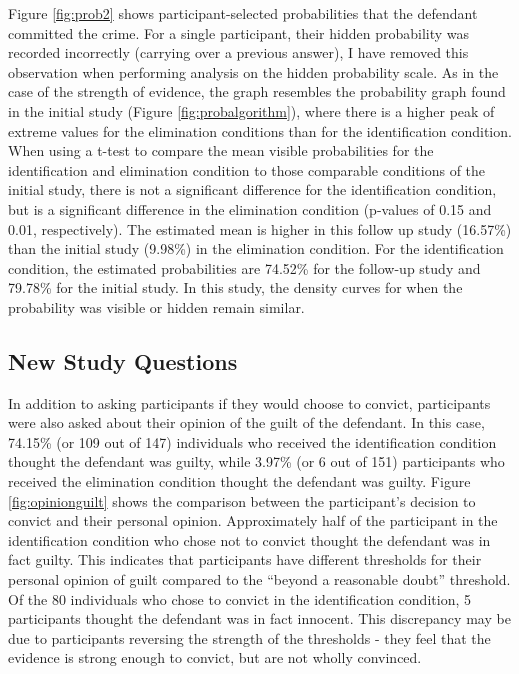 \documentclass[print]{nuthesis}
\begin{document}
Figure \ref{fig:prob2} shows participant-selected probabilities that the defendant committed the crime.
For a single participant, their  hidden probability was recorded incorrectly (carrying over a previous answer), I have removed this observation when performing analysis on the hidden probability scale.
As in the case of the strength of evidence, the graph resembles the probability graph found in the initial study (Figure \ref{fig:probalgorithm}), where there is a higher peak of extreme values for the elimination conditions than for the identification condition.
When using a t-test to compare the mean visible probabilities for the identification and elimination condition to those comparable conditions of the initial study, there is not a significant difference for the identification condition, but is a significant difference in the elimination condition (p-values of 0.15 and 0.01, respectively).
The estimated mean is higher in this follow up study (16.57\%) than the initial study (9.98\%) in the elimination condition.
For the identification condition, the estimated probabilities are 74.52\% for the follow-up study and 79.78\% for the initial study.
In this study, the density curves for when the probability was visible or hidden remain similar.

\hypertarget{new-study-questions}{%
\subsection{New Study Questions}\label{new-study-questions}}

In addition to asking participants if they would choose to convict, participants were also asked about their opinion of the guilt of the defendant.
In this case, 74.15\% (or 109 out of 147) individuals who received the identification condition thought the defendant was guilty, while 3.97\% (or 6 out of 151) participants who received the elimination condition thought the defendant was guilty.
Figure \ref{fig:opinionguilt} shows the comparison between the participant's decision to convict and their personal opinion.
Approximately half of the participant in the identification condition who chose not to convict thought the defendant was in fact guilty.
This indicates that participants have different thresholds for their personal opinion of guilt compared to the ``beyond a reasonable doubt'' threshold.
Of the 80 individuals who chose to convict in the identification condition, 5 participants thought the defendant was in fact innocent.
This discrepancy may be due to participants reversing the strength of the thresholds - they feel that the evidence is strong enough to convict, but are not wholly convinced.
\end{document}
